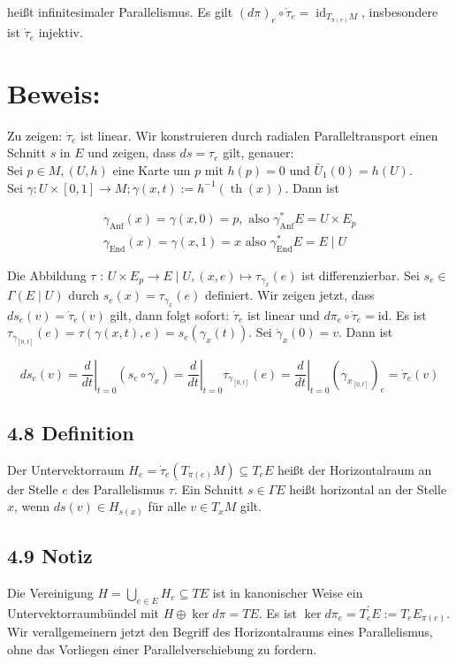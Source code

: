 heißt infinitesimaler Parallelismus. Es gilt $(d \pi)_{e} \circ \dot{\tau}_{e}=\operatorname{id}_{T_{\pi(e)} M}$, insbesondere ist $\dot{\tau}_{e}$ injektiv.

\section*{Beweis:}
Zu zeigen: $\dot{\tau}_{e}$ ist linear. Wir konstruieren durch radialen Paralleltransport einen Schnitt $s$ in $E$ und zeigen, dass $d s=\tau_{e}$ gilt, genauer:\\
Sei $p \in M,(U, h)$ eine Karte um $p$ mit $h(p)=0$ und $\bar{U}_{1}(0)=h(U)$.\\
Sei $\gamma: U \times[0,1] \rightarrow M ; \gamma(x, t):=h^{-1}(\operatorname{th}(x))$. Dann ist

$$
\begin{gathered}
\gamma_{\mathrm{Anf}}(x)=\gamma(x, 0)=p, \text { also } \gamma_{\mathrm{Anf}}^{*} E=U \times E_{p} \\
\gamma_{\mathrm{End}}(x)=\gamma(x, 1)=x \text { also } \gamma_{\mathrm{End}}^{*} E=E \mid U
\end{gathered}
$$

Die Abbildung $\tau$ : $U \times E_{p} \rightarrow E \mid U,(x, e) \mapsto \tau_{\gamma_{x}}(e)$ ist differenzierbar. Sei $s_{e} \in$ $\Gamma(E \mid U)$ durch $s_{e}(x)=\tau_{\gamma_{x}}(e)$ definiert. Wir zeigen jetzt, dass $d s_{e}(v)=\dot{\tau}_{e}(v)$ gilt, dann folgt sofort: $\dot{\tau}_{e}$ ist linear und $d \pi_{e} \circ \dot{\tau}_{e}=\mathrm{id}$. Es ist $\tau_{\gamma_{[0, t]}}(e)=\tau(\gamma(x, t), e)=s_{e}\left(\gamma_{x}(t)\right)$. Sei $\dot{\gamma}_{x}(0)=v$. Dann ist

$$
d s_{e}(v)=\left.\frac{d}{d t}\right|_{t=0}\left(s_{e} \circ \gamma_{x}\right)=\left.\frac{d}{d t}\right|_{t=0} \tau_{\gamma_{[0, t]}}(e)=\left.\frac{d}{d t}\right|_{t=0}\left(\gamma_{x_{[0, t]}}\right)_{e}=\dot{\tau}_{e}(v)
$$

\subsection*{4.8 Definition}
Der Untervektorraum $H_{e}=\dot{\tau}_{e}\left(T_{\pi(e)} M\right) \subseteq T_{e} E$ heißt der Horizontalraum an der Stelle $e$ des Parallelismus $\tau$. Ein Schnitt $s \in \Gamma E$ heißt horizontal an der Stelle $x$, wenn $d s(v) \in H_{s(x)}$ für alle $v \in T_{x} M$ gilt.

\subsection*{4.9 Notiz}
Die Vereinigung $H=\bigcup_{e \in E} H_{e} \subseteq T E$ ist in kanonischer Weise ein Untervektorraumbündel mit $H \oplus \operatorname{ker} d \pi=T E$. Es ist $\operatorname{ker} d \pi_{e}=T_{e}^{\prime} E:=T_{e} E_{\pi(e)}$.\\
Wir verallgemeinern jetzt den Begriff des Horizontalraums eines Parallelismus, ohne das Vorliegen einer Parallelverschiebung zu fordern.

